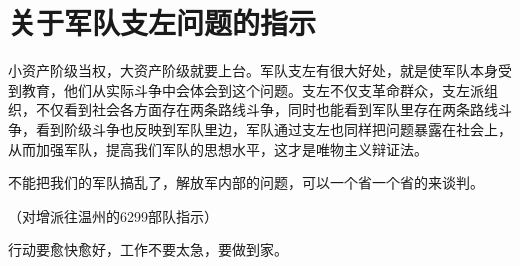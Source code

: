 \section[关于军队支左问题的指示（一九六七年八月）]{关于军队支左问题的指示}


小资产阶级当权，大资产阶级就要上台。军队支左有很大好处，就是使军队本身受到教育，他们从实际斗争中会体会到这个问题。支左不仅支革命群众，支左派组织，不仅看到社会各方面存在两条路线斗争，同时也能看到军队里存在两条路线斗争，看到阶级斗争也反映到军队里边，军队通过支左也同样把问题暴露在社会上，从而加强军队，提高我们军队的思想水平，这才是唯物主义辩证法。

不能把我们的军队搞乱了，解放军内部的问题，可以一个省一个省的来谈判。



（对增派往温州的6299部队指示）

行动要愈快愈好，工作不要太急，要做到家。

